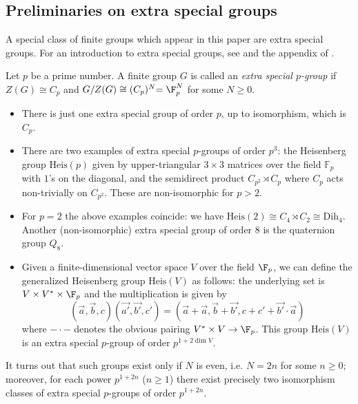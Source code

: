 \subsection{Preliminaries on extra special groups}\label{ssec:extra_special}
A special class of finite groups which appear in this paper are extra special groups. For an introduction to extra special groups, see \cite{Aschbacher} and the appendix of \cite{Diaconis}.

\begin{defi}
 Let $p$ be a prime number. A finite group $G$ is called an {\it extra special $p$-group} if $Z(G) \cong C_p$ and $G/Z(G) \cong (C_p)^N {= \F_p^N}$ for some $N\geq 0$. 
\end{defi}
\begin{exam}\label{ex:extra_special_groups}
\mbox{}
\begin{itemize}
 \item There is just one extra special group of order $p$, up to isomorphism, which is~$C_p$. 
 \item There are two examples of extra special $p$-groups of order $p^3$: the 
Heisenberg group $\mathrm{Heis}(p)$ given by upper-triangular $3\times 3$ matrices over the field 
$\mathbb{F}_p$ with $1$'s on the diagonal, and the semidirect product $C_{p^2} 
\rtimes C_p$ where $C_p$ acts non-trivially on $C_{p^2}$. These are non-isomorphic for $p>2$. 
 \item For $p=2$ the above examples coincide: we have $\mathrm{Heis}(2)\cong C_4 \rtimes C_2 \cong \mathrm{Dih}_4$. Another (non-isomorphic) extra special group of 
order $8$ is the quaternion group $Q_8$.
 \item Given a finite-dimensional vector space $V$ over the field $\F_p$, we can 
define the generalized Heisenberg group $\mathrm{Heis}(V)$ as follows: the underlying set 
is $V \times V^* \times \F_p$ and the multiplication is given by $$(\vec{a}, 
\vec{b}, c)(\vec{a'}, \vec{b'}, c') = (\vec{a} +\vec{a}, \vec{b}+\vec{b'}, c + 
c' + \vec{b'}\cdot\vec{a})$$ where $-\cdot -$ denotes the obvious pairing $V^* 
\times V \to \F_p$. This group $\mathrm{Heis}(V)$ is an extra special $p$-group of order 
$p^{1+2\dim V}$.
\end{itemize}

 
\end{exam}

It turns out that such groups exist only if $N$ is even, i.e. $N=2n$ for some 
$n\geq 0$; moreover, for each power $p^{1+2n}$ ($n\geq 1$) there exist precisely 
two isomorphism classes of extra special $p$-groups of order $p^{1+2n}$. 

